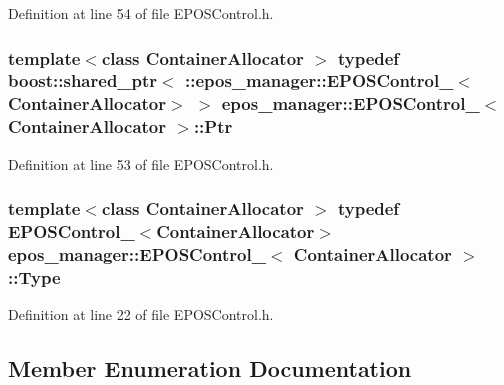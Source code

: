\-Definition at line 54 of file \-E\-P\-O\-S\-Control.\-h.

\subsubsection[{\-Ptr}]{\setlength{\rightskip}{0pt plus 5cm}template$<$class Container\-Allocator $>$ typedef boost\-::shared\-\_\-ptr$<$ \-::{\bf epos\-\_\-manager\-::\-E\-P\-O\-S\-Control\-\_\-}$<$\-Container\-Allocator$>$ $>$ {\bf epos\-\_\-manager\-::\-E\-P\-O\-S\-Control\-\_\-}$<$ \-Container\-Allocator $>$\-::{\bf \-Ptr}}\label{structepos__manager_1_1EPOSControl___adc70fd0590d2aa5f3ee82a77ee163d2f}


\-Definition at line 53 of file \-E\-P\-O\-S\-Control.\-h.

\subsubsection[{\-Type}]{\setlength{\rightskip}{0pt plus 5cm}template$<$class Container\-Allocator $>$ typedef {\bf \-E\-P\-O\-S\-Control\-\_\-}$<$\-Container\-Allocator$>$ {\bf epos\-\_\-manager\-::\-E\-P\-O\-S\-Control\-\_\-}$<$ \-Container\-Allocator $>$\-::{\bf \-Type}}\label{structepos__manager_1_1EPOSControl___aa35da6e523458e4b62b76d8ebf6eb481}


\-Definition at line 22 of file \-E\-P\-O\-S\-Control.\-h.



\subsection{\-Member \-Enumeration \-Documentation}
